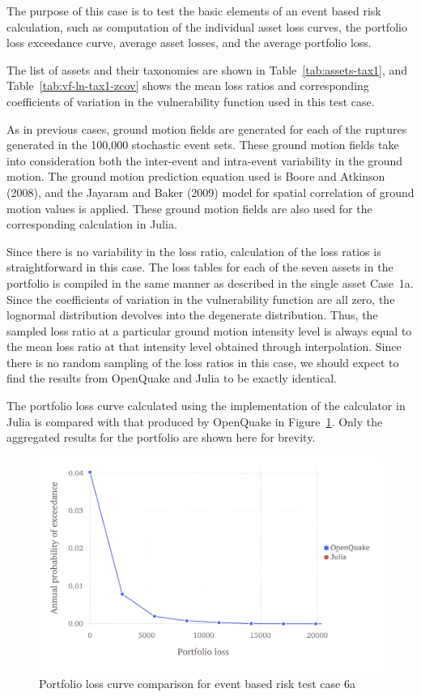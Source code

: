 The purpose of this case is to test the basic elements of an event based risk calculation, such as computation of the individual asset loss curves, the portfolio loss exceedance curve, average asset losses, and the average portfolio loss.

The list of assets and their taxonomies are shown in Table~\ref{tab:assets-tax1}, and Table~\ref{tab:vf-ln-tax1-zcov} shows the mean loss ratios and corresponding coefficients of variation in the vulnerability function used in this test case.

As in previous cases, ground motion fields are generated for each of the ruptures generated in the 100,000 stochastic event sets. These ground motion fields take into consideration both the inter-event and intra-event variability in the ground motion. The ground motion prediction equation used is Boore and Atkinson (2008), and the Jayaram and Baker (2009) model for spatial correlation of ground motion values is applied. These ground motion fields are also used for the corresponding calculation in Julia.

Since there is no variability in the loss ratio, calculation of the loss ratios is straightforward in this case. The loss tables for each of the seven assets in the portfolio is compiled in the same manner as described in the single asset Case~1a. Since the coefficients of variation in the vulnerability function are all zero, the lognormal distribution devolves into the degenerate distribution. Thus, the sampled loss ratio at a particular ground motion intensity level is always equal to the mean loss ratio at that intensity level obtained through interpolation. Since there is no random sampling of the loss ratios in this case, we should expect to find the results from OpenQuake and Julia to be exactly identical.

The portfolio loss curve calculated using the implementation of the calculator in Julia is compared with that produced by OpenQuake in Figure~\ref{fig:lc-ebr-6a}. Only the aggregated results for the portfolio are shown here for brevity.

\begin{figure}[htbp]
\centering
\includegraphics[width=12cm]{qareport/figures/fig-lc-ebr-6a}
\caption{Portfolio loss curve comparison for event based risk test case 6a}
\label{fig:lc-ebr-6a}
\end{figure}